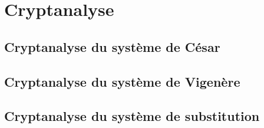 \chapter{Cryptanalyse}
	\section{Cryptanalyse du système de César}
	\section{Cryptanalyse du système de Vigenère}
	\section{Cryptanalyse du système de substitution}